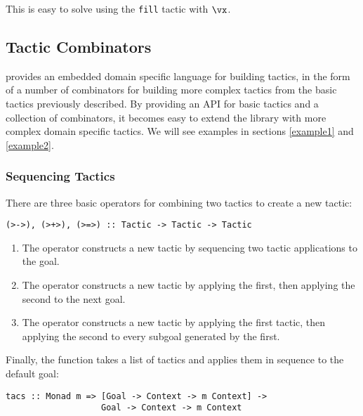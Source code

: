 
This is easy to solve using the \texttt{fill} tactic with $\vx$.

\subsection{Tactic Combinators}

\label{combinators}

\Ivor{} provides an embedded domain specific language for
building tactics, in the form of a number of
combinators for building more complex tactics from the basic tactics
previously described. By providing an API for basic tactics and a
collection of combinators, it becomes easy to extend the library with
more complex domain specific tactics. We will see examples in
sections \ref{example1} and \ref{example2}.

\subsubsection{Sequencing Tactics}
There are three basic operators for combining two tactics to create a 
new tactic:

\begin{verbatim}
(>->), (>+>), (>=>) :: Tactic -> Tactic -> Tactic
\end{verbatim}

\begin{enumerate}
\item The \hdecl{>->} operator constructs a new tactic by sequencing two
tactic applications to the  goal.

\item The \hdecl{>+>} operator constructs a new tactic by applying the
  first, then applying the second to the next  goal.

\item The \hdecl{>=>} operator constructs a new tactic by applying the first
tactic, then applying the second to every subgoal generated by the first.

\end{enumerate}

Finally, the  function takes a list of tactics and applies
them in sequence to the default goal:

\begin{verbatim}
tacs :: Monad m => [Goal -> Context -> m Context] ->
                   Goal -> Context -> m Context
\end{verbatim}


